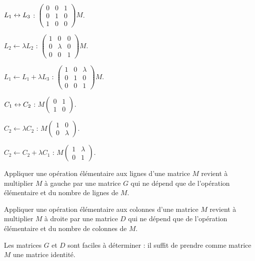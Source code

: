\begin{corr}~\\
\(L_1\leftrightarrow L_3\) : \(\begin{pmatrix}
0 & 0 & 1 \\
0 & 1 & 0 \\
1 & 0 & 0
\end{pmatrix}M\).

\(L_2\gets\lambda L_2\) : \(\begin{pmatrix}
1 & 0 & 0 \\
0 & \lambda & 0 \\
0 & 0 & 1
\end{pmatrix}M\).

\(L_1\gets L_1+\lambda L_3\) : \(\begin{pmatrix}
1 & 0 & \lambda \\
0 & 1 & 0 \\
0 & 0 & 1
\end{pmatrix}M\).

\(C_1\leftrightarrow C_2\) : \(M\begin{pmatrix}
0 & 1 \\
1 & 0
\end{pmatrix}\).

\(C_2\gets\lambda C_2\) : \(M\begin{pmatrix}
1 & 0 \\
0 & \lambda
\end{pmatrix}\).

\(C_2\gets C_2+\lambda C_1\) : \(M\begin{pmatrix}
1 & \lambda \\
0 & 1
\end{pmatrix}\).
\end{corr}

\begin{bilan}
Appliquer une opération élémentaire aux lignes d'une matrice \(M\) revient à multiplier \(M\) à gauche par une matrice \(G\) qui ne dépend que de l'opération élémentaire et du nombre de lignes de \(M\).

Appliquer une opération élémentaire aux colonnes d'une matrice \(M\) revient à multiplier \(M\) à droite par une matrice \(D\) qui ne dépend que de l'opération élémentaire et du nombre de colonnes de \(M\).

Les matrices \(G\) et \(D\) sont faciles à déterminer : il suffit de prendre comme matrice \(M\) une matrice identité.
\end{bilan}

